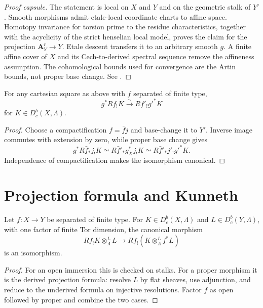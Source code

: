\begin{proof}[Proof capsule]
The statement is local on \(X\) and \(Y\) and on the geometric stalk of
\(Y'\).  Smooth morphisms admit etale-local coordinate charts to affine
space.  Homotopy invariance for torsion prime to the residue characteristics,
together with the acyclicity of the strict henselian local model, proves the
claim for the projection \(\mathbf A^r_Y\to Y\).  Etale descent transfers it
to an arbitrary smooth \(g\).  A finite affine cover of \(X\) and its
Cech-to-derived spectral sequence remove the affineness assumption.  The
cohomological bounds used for convergence are the Artin bounds, not proper
base change.  See \cite[Expos\'e XVI]{SGA4}.
\end{proof}

\begin{theorem}
\label{thm:compact-support-base-change}
For any cartesian square as above with \(f\) separated of finite type,
\[
  g^*Rf_!K\xrightarrow{\sim}Rf'_!g'^*K
\]
for \(K\in D^b_c(X,\Lambda)\).
\end{theorem}

\begin{proof}
Choose a compactification \(f=\bar f j\) and base-change it to \(Y'\).
Inverse image commutes with extension by zero, while proper base change gives
\[
g^*R\bar f_*j_!K
\simeq R\bar f'_*g_{\overline X}^*j_!K
\simeq R\bar f'_*j'_!g'^*K.
\]
Independence of compactification makes the isomorphism canonical.
\end{proof}

\section{Projection formula and Kunneth}

\begin{theorem}
\label{thm:projection-formula-torsion}
Let \(f:X\to Y\) be separated of finite type.  For
\(K\in D^b_c(X,\Lambda)\) and \(L\in D^b_c(Y,\Lambda)\), with one factor of
finite Tor dimension, the canonical morphism
\[
  Rf_!K\otimes_\Lambda^L L
  \longrightarrow
  Rf_!(K\otimes_\Lambda^L f^*L)
\]
is an isomorphism.
\end{theorem}

\begin{proof}
For an open immersion this is checked on stalks.  For a proper morphism it is
the derived projection formula: resolve \(L\) by flat sheaves, use adjunction,
and reduce to the underived formula on injective resolutions.  Factor \(f\)
as open followed by proper and combine the two cases.
\end{proof}

